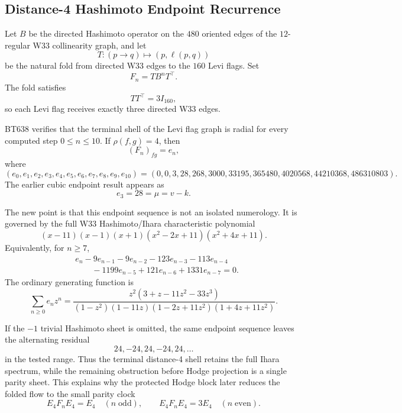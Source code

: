 \subsection{Distance-4 Hashimoto Endpoint Recurrence}
\label{subsec:bt639-distance4-hashimoto-endpoint-recurrence}

Let \(B\) be the directed Hashimoto operator on the \(480\) oriented edges of the
\(12\)-regular W33 collinearity graph, and let
\[
T:(p\to q)\longmapsto (p,\ell(p,q))
\]
be the natural fold from directed W33 edges to the \(160\) Levi flags.  Set
\[
F_n=TB^nT^{\top}.
\]
The fold satisfies
\[
TT^{\top}=3I_{160},
\]
so each Levi flag receives exactly three directed W33 edges.

BT638 verifies that the terminal shell of the Levi flag graph is radial for every
computed step \(0\le n\le 10\).  If \(\rho(f,g)=4\), then
\[
(F_n)_{fg}=e_n,
\]
where
\[
(e_0,e_1,e_2,e_3,e_4,e_5,e_6,e_7,e_8,e_9,e_{10})
=
(0,0,3,28,268,3000,33195,365480,4020568,44210368,486310803).
\]
The earlier cubic endpoint result appears as
\[
e_3=28=\mu=v-k.
\]

The new point is that this endpoint sequence is not an isolated numerology.  It
is governed by the full W33 Hashimoto/Ihara characteristic polynomial
\[
\boxed{
(x-11)(x-1)(x+1)(x^2-2x+11)(x^2+4x+11).
}
\]
Equivalently, for \(n\ge7\),
\[
\boxed{
\begin{aligned}
&e_n-9e_{n-1}-9e_{n-2}-123e_{n-3}-113e_{n-4}\\
&\qquad -1199e_{n-5}+121e_{n-6}+1331e_{n-7}=0.
\end{aligned}
}
\]
The ordinary generating function is
\[
\boxed{
\sum_{n\ge0}e_nz^n
=\frac{z^2(3+z-11z^2-33z^3)}{(1-z^2)(1-11z)(1-2z+11z^2)(1+4z+11z^2)}.
}
\]

If the \(-1\) trivial Hashimoto sheet is omitted, the same endpoint sequence
leaves the alternating residual
\[
\boxed{24,-24,24,-24,24,\ldots}
\]
in the tested range.  Thus the terminal distance-4 shell retains the full
Ihara spectrum, while the remaining obstruction before Hodge projection is a
single parity sheet.  This explains why the protected Hodge block later reduces
the folded flow to the small parity clock
\[
E_4F_nE_4=E_4\quad(n\;\mathrm{odd}),
\qquad
E_4F_nE_4=3E_4\quad(n\;\mathrm{even}).
\]
